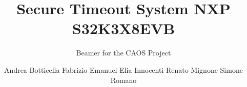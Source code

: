 \documentclass{beamer}
\title{Secure Timeout System \newline NXP S32K3X8EVB}
\subtitle{Beamer for the CAOS Project}
\author{
    \newline Andrea Botticella
    \newline Fabrizio Emanuel 
    \newline Elia Innocenti
    \newline Renato Mignone 
    \newline Simone Romano     
}
\begin{document}
\maketitle







\title{}
\backmatter
\end{document}
